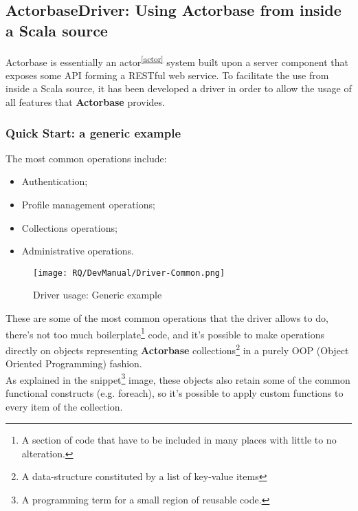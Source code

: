 \documentclass{scalatekids-article}
\begin{document}

\subsection{ActorbaseDriver: Using Actorbase from inside a Scala source}

Actorbase is essentially an actor\textsuperscript{\ref{actor}} system built upon a server component that
exposes some API forming a RESTful web service. To facilitate the use from
inside a Scala source, it has been developed a driver in order to allow the
usage of all features that \textbf{Actorbase} provides.\\

\subsubsection{Quick Start: a generic example}

The most common operations include:
\begin{itemize}
\item Authentication;
\item Profile management operations;
\item Collections operations;
\item Administrative operations.
\end{itemize}

\begin{figure}[H]
  \begin{center}
    \texttt{[image: RQ/DevManual/Driver-Common.png]}
    \caption{Driver usage: Generic example}
  \end{center}
\end{figure}

These are some of the most common operations that the driver allows to do,
there's not too much boilerplate\footnote{A section of code that have to be
  included in many places with little to no alteration.} code, and it's possible
to make operations directly on objects representing \textbf{Actorbase}
collections\footnote{A data-structure constituted by a list of key-value items\label{coll}}
in a purely OOP (Object Oriented Programming) fashion.\\ As explained in
the snippet\footnote{A programming term for a small region of reusable code.}
image, these objects also retain some of the common functional constructs (e.g.
foreach), so it's possible to apply custom functions to every item of the
collection.
\end{document}
